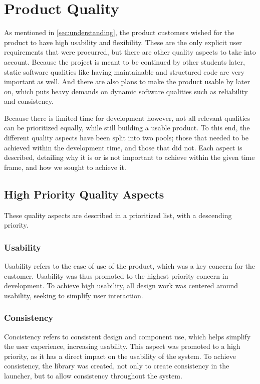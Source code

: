 \section{Product Quality}
As mentioned in \autoref{sec:understanding}, the product customers wished for the product to have high usability and flexibility. 
These are the only explicit user requirements that were procurred, but there are other quality aspects to take into account. 
Because the project is meant to be continued by other students later, static software qualities like having maintainable and structured code are very important as well. 
And there are also plans to make the product usable by \autists[] later on, which puts heavy demands on dynamic software qualities such as reliability and consistency. \newline

Because there is limited time for development however, not all relevant qualities can be prioritized equally, while still building a usable product. 
To this end, the different quality aspects have been split into two pools; those that needed to be achieved within the development time, and those that did not. 
Each aspect is described, detailing why it is or is not important to achieve within the given time frame, and how we sought to achieve it. 

\subsection{High Priority Quality Aspects}
These quality aspects are described in a prioritized list, with a descending priority. 

\subsubsection{Usability}
Usability refers to the ease of use of the product, which was a key concern for the customer.
Usability was thus promoted to the highest priority concern in development. 
To achieve high usability, all design work was centered around usability, seeking to simplify user interaction. 

\subsubsection{Consistency}
Concistency refers to consistent design and component use, which helps simplify the user experience, increasing usability\citep[page 90]{dieb-book}. 
This aspect was promoted to a high priority, as it has a direct impact on the usability of the system. 
To achieve consistency, the \guicomponents[] library was created, not only to create consistency in the launcher, but to allow consistency throughout the system. 

